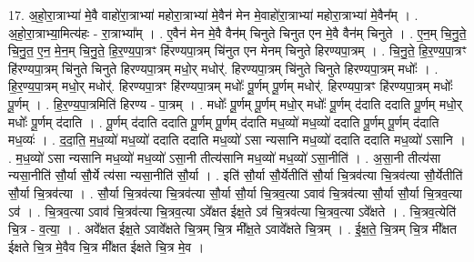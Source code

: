 \documentclass[17pt]{extarticle}
\begin{document}
17. अ॒हो॒रा॒त्राभ्या॑ मे॒वै वाहो॑रा॒त्राभ्या॑ महोरा॒त्राभ्या॑ मे॒वैन॑ मेन मे॒वाहो॑रा॒त्राभ्या॑ महोरा॒त्राभ्या॑ मे॒वैन᳚म् । . अ॒हो॒रा॒त्राभ्या॒मित्य॑हः - रा॒त्राभ्या᳚म् । . ए॒वैन॑ मेन मे॒वै वैन॑म् चिनुते चिनुत एन मे॒वै वैन॑म् चिनुते । . ए॒न॒म् चि॒नु॒ते॒ चि॒नु॒त॒ ए॒न॒ मे॒न॒म् चि॒नु॒ते॒ हि॒र॒ण्य॒पा॒त्रꣳ हि॑रण्यपा॒त्रम् चि॑नुत एन मेनम् चिनुते हिरण्यपा॒त्रम् । . चि॒नु॒ते॒ हि॒र॒ण्य॒पा॒त्रꣳ हि॑रण्यपा॒त्रम् चि॑नुते चिनुते हिरण्यपा॒त्रम् मधो॒र् मधोर्॑. हिरण्यपा॒त्रम् चि॑नुते चिनुते हिरण्यपा॒त्रम् मधोः᳚ । . हि॒र॒ण्य॒पा॒त्रम् मधो॒र् मधोर्॑. हिरण्यपा॒त्रꣳ हि॑रण्यपा॒त्रम् मधोः᳚ पू॒र्णम् पू॒र्णम् मधोर्॑. हिरण्यपा॒त्रꣳ हि॑रण्यपा॒त्रम् मधोः᳚ पू॒र्णम् । . हि॒र॒ण्य॒पा॒त्रमिति॑ हिरण्य - पा॒त्रम् । . मधोः᳚ पू॒र्णम् पू॒र्णम् मधो॒र् मधोः᳚ पू॒र्णम् द॑दाति ददाति पू॒र्णम् मधो॒र् मधोः᳚ पू॒र्णम् द॑दाति । . पू॒र्णम् द॑दाति ददाति पू॒र्णम् पू॒र्णम् द॑दाति मध॒व्यो॑ मध॒व्यो॑ ददाति पू॒र्णम् पू॒र्णम् द॑दाति मध॒व्यः॑ । . द॒दा॒ति॒ म॒ध॒व्यो॑ मध॒व्यो॑ ददाति ददाति मध॒व्यो॑ ऽसा न्यसानि मध॒व्यो॑ ददाति ददाति मध॒व्यो॑ ऽसानि । . म॒ध॒व्यो॑ ऽसा न्यसानि मध॒व्यो॑ मध॒व्यो॑ ऽसा॒नी तीत्य॑सानि मध॒व्यो॑ मध॒व्यो॑ ऽसा॒नीति॑ । . अ॒सा॒नी तीत्य॑सा न्यसा॒नीति॑ सौ॒र्या सौ॒र्ये त्य॑सा न्यसा॒नीति॑ सौ॒र्या । . इति॑ सौ॒र्या सौ॒र्येतीति॑ सौ॒र्या चि॒त्रव॑त्या चि॒त्रव॑त्या सौ॒र्येतीति॑ सौ॒र्या चि॒त्रव॑त्या । . सौ॒र्या चि॒त्रव॑त्या चि॒त्रव॑त्या सौ॒र्या सौ॒र्या चि॒त्रव॒त्या ऽवाव॑ चि॒त्रव॑त्या सौ॒र्या सौ॒र्या चि॒त्रव॒त्या ऽव॑ । . चि॒त्रव॒त्या ऽवाव॑ चि॒त्रव॑त्या चि॒त्रव॒त्या ऽवे᳚क्षत ईक्ष॒ते ऽव॑ चि॒त्रव॑त्या चि॒त्रव॒त्या ऽवे᳚क्षते । . चि॒त्रव॒त्येति॑ चि॒त्र - व॒त्या॒ । . अवे᳚क्षत ईक्ष॒ते ऽवावे᳚क्षते चि॒त्रम् चि॒त्र मी᳚क्ष॒ते ऽवावे᳚क्षते चि॒त्रम् । . ई॒क्ष॒ते॒ चि॒त्रम् चि॒त्र मी᳚क्षत ईक्षते चि॒त्र मे॒वैव चि॒त्र मी᳚क्षत ईक्षते चि॒त्र मे॒व । \newline
\end{document}
